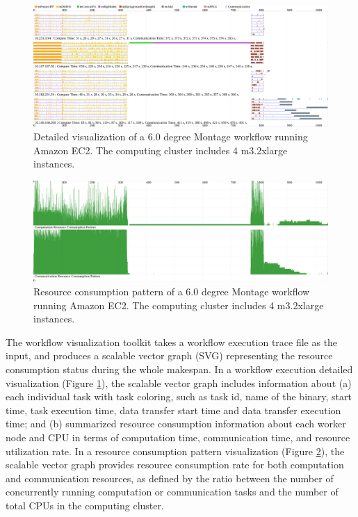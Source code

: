 \begin{figure}[ht]
\centering
\includegraphics[width=16cm]{visual}
\caption{Detailed visualization of a 6.0 degree Montage workflow running Amazon EC2. The computing cluster includes 4 m3.2xlarge instances.}
\label{fig:detail}
\end{figure}

\begin{figure}[ht]
\centering
\includegraphics[width=16cm]{pattern}
\caption{Resource consumption pattern of a 6.0 degree Montage workflow running Amazon EC2. The computing cluster includes 4 m3.2xlarge instances.}
\label{fig:pattern}
\end{figure}



The workflow visualization toolkit takes a workflow execution trace file as the input, and produces a scalable vector graph (SVG) representing the resource consumption status during the whole makespan. In a workflow execution detailed visualization (Figure \ref{fig:detail}), the scalable vector graph includes information about (a) each individual task with task coloring, such as task id, name of the binary, 
start time, task execution time, data transfer start time and data transfer execution time; and (b) summarized resource consumption information about each worker node and CPU in terms of computation time, communication time, and resource utilization rate. In a resource consumption pattern visualization (Figure \ref{fig:pattern}), the scalable vector graph provides resource consumption rate for both computation and communication resources, as defined by the ratio between the number of concurrently running computation or communication tasks and the number of total CPUs in the computing cluster.


